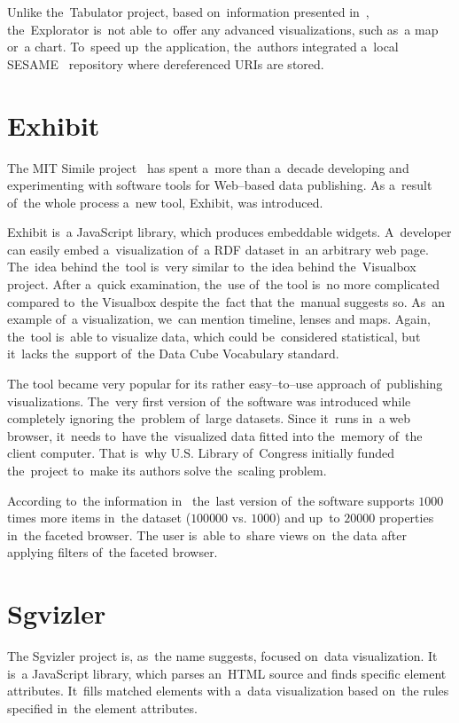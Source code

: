 Unlike the~Tabulator project, based on~information presented in~\cite{explorator},
the~Explorator is~not able to~offer any advanced visualizations, such as~a map or~a chart. To~speed up~the application, the~authors integrated a~local SESAME~\cite{sesame} 
repository where dereferenced URIs are stored.

\section{Exhibit}
The MIT Simile project~\cite{mit-simile} has spent a~more than a~decade
developing and experimenting with software tools for Web--based data publishing.
As a~result of~the whole process a~new tool, Exhibit, was introduced.

Exhibit is~a JavaScript library, which produces embeddable widgets. A~developer can
easily embed a~visualization of~a RDF dataset in~an arbitrary web page. The~idea behind 
the~tool is~very similar to~the idea behind the~Visualbox project. After a~quick 
examination, the~use of~the tool is~no more complicated compared to~the 
Visualbox despite the~fact that the~manual suggests so. As~an example of~a 
visualization, we~can mention timeline, lenses and maps. Again, the~tool is~able 
to visualize data, which could be~considered statistical, but it~lacks the~support of~the Data Cube Vocabulary standard.

The tool became very popular for its rather easy--to--use 
approach of~publishing visualizations. The~very first version of~the software
was introduced while completely ignoring the~problem of~large datasets.
Since it~runs in~a web browser, it~needs to~have the~visualized data
fitted into the~memory of~the client 
computer. That is~why U.S. Library of~Congress initially funded the~project to~make its authors solve the~scaling problem.

According to~the information in~\cite{exhibit}
the~last version of~the software supports $1000$ times more items in~the
dataset ($100 000$ vs. $1000$) and up~to $20 000$ properties in~the faceted browser. 
The user is~able to~share views on~the data after applying filters of~the 
faceted browser. 

\section{Sgvizler}
The Sgvizler project is, as~the name suggests, focused on~data visualization. 
It is~a JavaScript library, which parses an~HTML source and finds specific 
element attributes. It~fills matched elements with a~data visualization based on~the rules specified in~the element attributes.

